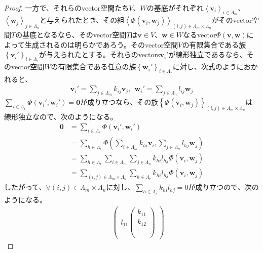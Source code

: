 \documentclass[dvipdfmx]{jsarticle}
\begin{document}
\begin{proof}
一方で、それらのvector空間たち$V$、$W$の基底がそれぞれ$\left\langle \mathbf{v}_{i} \right\rangle_{i \in \varLambda_{m}}$、$\left\langle \mathbf{w}_{j} \right\rangle_{j \in \varLambda_{n}}$と与えられたとき、その組$\left\langle \varPhi\left( \mathbf{v}_{i},\mathbf{w}_{j} \right) \right\rangle_{(i,j) \in \varLambda_{m} \times \varLambda_{n}}$がそのvector空間$T$の基底となるなら、そのvector空間$T$は$\mathbf{v} \in V$、$\mathbf{w} \in W$なるvector$\varPhi\left( \mathbf{v},\mathbf{w} \right)$によって生成されるのは明らかであろう。そのvector空間$V$の有限集合である族$\left\{ \mathbf{v}_{i}' \right\}_{i \in \varLambda_{r}}$が与えられたとする。それらのvectors$\mathbf{v}_{i}'$が線形独立であるなら、そのvector空間$W$の有限集合である任意の族$\left\{ \mathbf{w}_{i}' \right\}_{i \in \varLambda_{r}}$に対し、次式のようにおかれると、
\begin{align*}
\mathbf{v}_{i}' = \sum_{j \in \varLambda_{m}} {k_{ij}\mathbf{v}_{j}},\ \ \mathbf{w}_{i}' = \sum_{j \in \varLambda_{n}} {l_{ij}\mathbf{w}_{j}}
\end{align*}
$\sum_{i \in \varLambda_{r}} {\varPhi\left( \mathbf{v}_{i}',\mathbf{w}_{i}' \right)} = \mathbf{0}$が成り立つなら、その族$\left\{ \varPhi\left( \mathbf{v}_{i},\mathbf{w}_{j} \right) \right\}_{(i,j) \in \varLambda_{m} \times \varLambda_{n}}$は線形独立なので、次のようになる。
\begin{align*}
\mathbf{0} &= \sum_{i \in \varLambda_{r}} {\varPhi\left( \mathbf{v}_{i}',\mathbf{w}_{i}' \right)}\\
&= \sum_{h \in \varLambda_{r}} {\varPhi\left( \sum_{i \in \varLambda_{m}} {k_{hi}\mathbf{v}_{i}},\sum_{j \in \varLambda_{n}} {l_{hj}\mathbf{w}_{j}} \right)}\\
&= \sum_{h \in \varLambda_{r}} {\sum_{i \in \varLambda_{m}} {\sum_{j \in \varLambda_{n}} {k_{hi}l_{hj}\varPhi\left( \mathbf{v}_{i},\mathbf{w}_{j} \right)}}}\\
&= \sum_{(i,j) \in \varLambda_{m} \times \varLambda_{n}} {\sum_{h \in \varLambda_{r}} {k_{hi}l_{hj}}\varPhi\left( \mathbf{v}_{i},\mathbf{w}_{j} \right)}
\end{align*}
したがって、$\forall(i,j) \in \varLambda_{m} \times \varLambda_{n}$に対し、$\sum_{h \in \varLambda_{r}} {k_{hi}l_{hj}} = 0$が成り立つので、次のようになる。
\begin{align*}
&\quad \begin{pmatrix}
l_{11}\begin{pmatrix}
k_{11} \\
k_{12} \\
 \vdots \\

\end{pmatrix}
\end{pmatrix}
\end{align*}
\end{proof}
\end{document}
